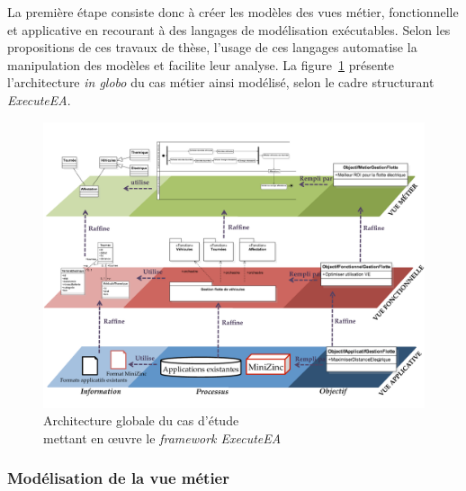     La première étape consiste donc à créer les modèles des vues métier, fonctionnelle
    et applicative en recourant à des langages de modélisation exécutables. Selon les
    propositions de ces travaux de thèse, l'usage de ces langages automatise
    la manipulation des modèles et facilite leur analyse. La
    figure~\ref{fig:architecture_generale_usecase} présente l'architecture \emph{in globo}
    du cas métier ainsi modélisé, selon le cadre structurant \emph{ExecuteEA}.








\begin{figure}[!htbp]
  \centering
  \includegraphics[angle=90, width=1\textwidth]{figures/5_implementation/architecture_generale_usecase.pdf}
 \caption{Architecture globale du cas d'étude \\mettant en œuvre le \protect\emph{framework ExecuteEA}}
 \label{fig:architecture_generale_usecase}
\end{figure}


\subsubsection{Modélisation de la vue métier} 

